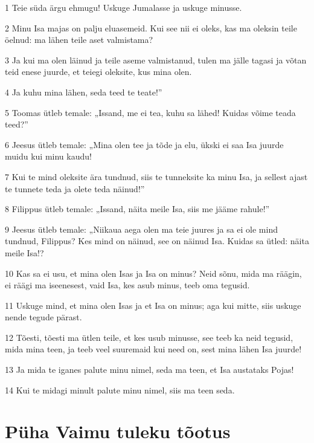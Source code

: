 \par 1 Teie süda ärgu ehmugu! Uskuge Jumalasse ja uskuge minusse.
\par 2 Minu Isa majas on palju eluasemeid. Kui see nii ei oleks, kas ma oleksin teile öelnud: ma lähen teile aset valmistama?
\par 3 Ja kui ma olen läinud ja teile aseme valmistanud, tulen ma jälle tagasi ja võtan teid enese juurde, et teiegi oleksite, kus mina olen.
\par 4 Ja kuhu mina lähen, seda teed te teate!”
\par 5 Toomas ütleb temale: „Issand, me ei tea, kuhu sa lähed! Kuidas võime teada teed?”
\par 6 Jeesus ütleb temale: „Mina olen tee ja tõde ja elu, ükski ei saa Isa juurde muidu kui minu kaudu!
\par 7 Kui te mind oleksite ära tundnud, siis te tunneksite ka minu Isa, ja sellest ajast te tunnete teda ja olete teda näinud!”
\par 8 Filippus ütleb temale: „Issand, näita meile Isa, siis me jääme rahule!”
\par 9 Jeesus ütleb temale: „Niikaua aega olen ma teie juures ja sa ei ole mind tundnud, Filippus? Kes mind on näinud, see on näinud Isa. Kuidas sa ütled: näita meile Isa!?
\par 10 Kas sa ei usu, et mina olen Isas ja Isa on minus? Neid sõnu, mida ma räägin, ei räägi ma iseenesest, vaid Isa, kes asub minus, teeb oma tegusid.
\par 11 Uskuge mind, et mina olen Isas ja et Isa on minus; aga kui mitte, siis uskuge nende tegude pärast.
\par 12 Tõesti, tõesti ma ütlen teile, et kes usub minusse, see teeb ka neid tegusid, mida mina teen, ja teeb veel suuremaid kui need on, sest mina lähen Isa juurde!
\par 13 Ja mida te iganes palute minu nimel, seda ma teen, et Isa austataks Pojas!
\par 14 Kui te midagi minult palute minu nimel, siis ma teen seda.

\section*{Püha Vaimu tuleku tõotus}

